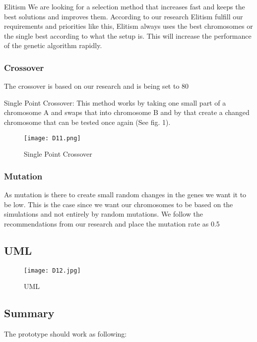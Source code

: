 Elitism
We are looking for a selection method that increases fast and keeps the best solutions and improves them. According to our research Elitism fulfill our requirements and priorities like this, Elitism always uses the best chromosomes or the single best according to what the setup is. This will increase the performance of the genetic algorithm rapidly.

\subsubsection{Crossover}
The crossover is based on our research and is being set to 80%

Single Point Crossover:
This method works by taking one small part of a chromosome A and swaps that into chromosome B and by that create a changed chromosome that can be tested once again (See fig. 1).


\begin{figure}[!htbp]
\centering
\texttt{[image: D11.png]}
\caption{ Single Point Crossover }
\label{fig:Crossover}
\end{figure}


\subsubsection{Mutation}
As mutation is there to create small random changes in the genes we want it to be low. This is the case since we want our chromosomes to be based on the simulations and not entirely by random mutations. We follow the recommendations from our research and place the mutation rate as 0.5%

\subsection{UML}

\begin{figure}[!htbp]
\centering
\texttt{[image: D12.jpg]}
\caption{ UML }
\label{fig:UML}
\end{figure}

\subsection{Summary}

The prototype should work as following:

